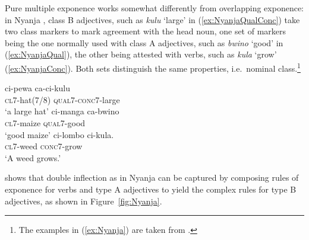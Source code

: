 \documentclass[output=paper,biblatex,babelshorthands,newtxmath,draftmode,colorlinks,citecolor=brown]{langscibook}
\begin{document}
\begin{exe}
\begin{xlist}
\begin{exe}
\begin{xlist}
Pure multiple exponence works somewhat differently from
overlapping exponence: in Nyanja \citep{Stump01,Crysmann:14:OUP},
class B adjectives, such as \textit{kulu} `large' in (\ref{ex:NyanjaQualConc}) take two class markers to
mark agreement with the head noun, one set of markers being the one
normally used with class A adjectives, such as \textit{bwino} `good' in (\ref{ex:NyanjaQual}), the other being attested with
verbs, such as \textit{kula} `grow' (\ref{ex:NyanjaConc}). Both sets distinguish the same
properties, i.e.\ nominal class.\label{Nyanja}\footnote{The examples in (\ref{ex:Nyanja}) are taken from .}

\eal
\label{ex:Nyanja}
\ex\label{ex:NyanjaQualConc}
\gll ci-pewa ca-ci-kulu\\
    \textsc{cl7}-hat(7/8) \textsc{qual7}-\textsc{conc7}-large\\
\glt `a large hat'
\ex
\label{ex:NyanjaQual} 
\gll ci-manga ca-bwino\\
    \textsc{cl7}-maize \textsc{qual7}-good\\
\glt `good maize'
\ex
\label{ex:NyanjaConc} 
\gll ci-lombo ci-kula.\\
    \textsc{cl7}-weed \textsc{conc7}-grow\\
\glt `A weed grows.'
\zl

\citet{Crysmann:14:OUP} shows that double inflection as in Nyanja
can be captured by composing rules of exponence for verbs and type A
adjectives to yield the complex rules for type B adjectives, as shown
in Figure~\ref{fig:Nyanja}. 


\end{xlist}
\end{exe}
\end{xlist}
\end{exe}
\end{document}
